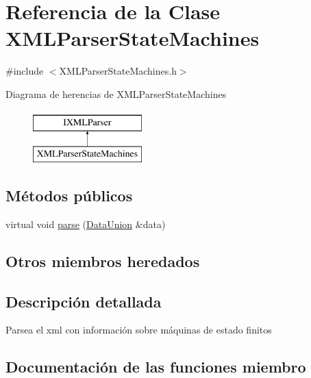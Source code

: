 \hypertarget{classXMLParserStateMachines}{}\section{Referencia de la Clase X\+M\+L\+Parser\+State\+Machines}
\label{classXMLParserStateMachines}


{\ttfamily \#include $<$X\+M\+L\+Parser\+State\+Machines.\+h$>$}

Diagrama de herencias de X\+M\+L\+Parser\+State\+Machines\begin{figure}[H]
\begin{center}
\leavevmode
\includegraphics[height=2.000000cm]{classXMLParserStateMachines}
\end{center}
\end{figure}
\subsection*{Métodos públicos}
\begin{DoxyCompactItemize}
\item 
virtual void \hyperlink{classXMLParserStateMachines_a7af4decc72879799aa43260418bb021b}{parse} (\hyperlink{unionDataUnion}{Data\+Union} \&data)
\end{DoxyCompactItemize}
\subsection*{Otros miembros heredados}


\subsection{Descripción detallada}
Parsea el xml con información sobre máquinas de estado finitos 

\subsection{Documentación de las funciones miembro}
\hypertarget{classXMLParserStateMachines_a7af4decc72879799aa43260418bb021b}{}
